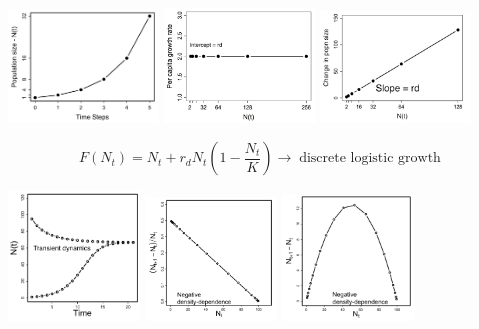 \documentclass{article}
\begin{document}
\begin{center}
\includegraphics[width=4cm]{figs/a.png}
\includegraphics[width=4cm]{figs/b.jpg}
\includegraphics[width=4cm]{figs/c.jpg}
\end{center}
\begin{equation*}
	F(N_t)=N_t + r_d N_t \left(1-\frac{N_t}{K}\right) \to \; \text{discrete logistic growth}
\end{equation*}
\begin{center}
\includegraphics[width=3.5cm]{figs/d.png}
\includegraphics[width=3.5cm]{figs/e.png}
\includegraphics[width=3.5cm]{figs/f.png}
\end{center}
\end{document}

